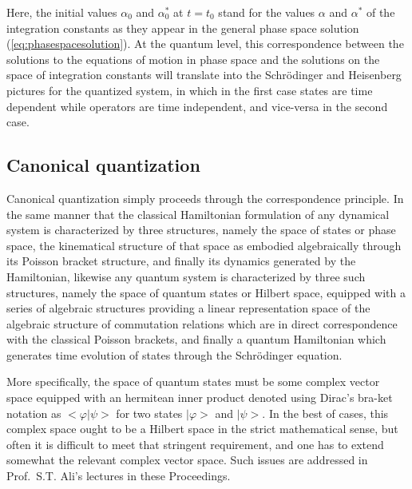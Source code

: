 \documentclass[a4paper,11pt]{article}
\begin{document}
Here, the initial values $\alpha_0$ and $\alpha^*_0$ at $t=t_0$ stand for the 
values $\alpha$ and $\alpha^*$ of the integration constants as they
appear in the general phase space solution (\ref{eq:phasespacesolution}).
At the quantum level, this correspondence between the solutions to the
equations of motion in phase space and the solutions on the space of 
integration constants will translate into the Schr\"odinger and
Heisenberg pictures for the quantized system, in which in the first
case states are time dependent while operators are time independent, 
and vice-versa in the second case.

\subsection{Canonical quantization}
\label{Subsect2.3}

Canonical quantization simply proceeds through the correspondence
principle. In the same manner that the classical Hamiltonian
formulation of any dynamical system is characterized by three structures,
namely the space of states or phase space, the kinematical
structure of that space as embodied algebraically through its Poisson 
bracket structure, and finally its dynamics generated by the Hamiltonian,
likewise any quantum system is cha\-rac\-te\-ri\-zed by three such structures,
namely the space of quantum states or Hilbert space, equipped with
a series of algebraic structures providing a linear re\-pre\-sen\-ta\-tion 
space of the algebraic structure of commutation relations which are in direct
correspondence with the classical Poisson brackets, and finally a quantum 
Hamiltonian which generates time evolution of states through the 
Schr\"odinger equation.

More specifically, the space of quantum states must be some complex
vector space equipped with an hermitean inner product denoted using
Dirac's bra-ket notation as $<\varphi|\psi>$ for two states
$|\varphi>$ and $|\psi>$. In the best of cases, this complex space
ought to be a Hilbert space in the strict mathematical sense, but
often it is difficult to meet that stringent requirement, and one
has to extend somewhat the relevant complex vector space. Such issues
are addressed in Prof.~S.T. Ali's lectures in these Proceedings.
\end{document}
